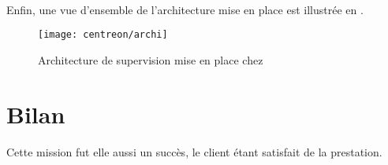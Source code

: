 \paragraph{}
Enfin, une vue d'ensemble de l'architecture mise en place est illustrée en .

\begin{figure}
	\centering
	\texttt{[image: centreon/archi]}
	\caption{Architecture de supervision mise en place chez \adacast{}}
	\label{figure:centreon:archi}
\end{figure}


\section{Bilan}

Cette mission fut elle aussi un succès, le client étant satisfait de la prestation.

